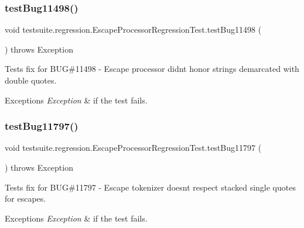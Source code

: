 \subsubsection{\texorpdfstring{test\+Bug11498()}{testBug11498()}}
{\footnotesize\ttfamily void testsuite.\+regression.\+Escape\+Processor\+Regression\+Test.\+test\+Bug11498 (\begin{DoxyParamCaption}{ }\end{DoxyParamCaption}) throws Exception}

Tests fix for B\+UG\#11498 -\/ Escape processor didn\textquotesingle{}t honor strings demarcated with double quotes.


\begin{DoxyExceptions}{Exceptions}
{\em Exception} & if the test fails. \\
\hline
\end{DoxyExceptions}
\mbox{\label{classtestsuite_1_1regression_1_1_escape_processor_regression_test_afce160178129cd6e5455a7da48112250}} 
\subsubsection{\texorpdfstring{test\+Bug11797()}{testBug11797()}}
{\footnotesize\ttfamily void testsuite.\+regression.\+Escape\+Processor\+Regression\+Test.\+test\+Bug11797 (\begin{DoxyParamCaption}{ }\end{DoxyParamCaption}) throws Exception}

Tests fix for B\+UG\#11797 -\/ Escape tokenizer doesn\textquotesingle{}t respect stacked single quotes for escapes.


\begin{DoxyExceptions}{Exceptions}
{\em Exception} & if the test fails. \\
\hline
\end{DoxyExceptions}
\mbox{\label{classtestsuite_1_1regression_1_1_escape_processor_regression_test_ae70f225ac0aefbe783d3f4a137c0b66d}} 
